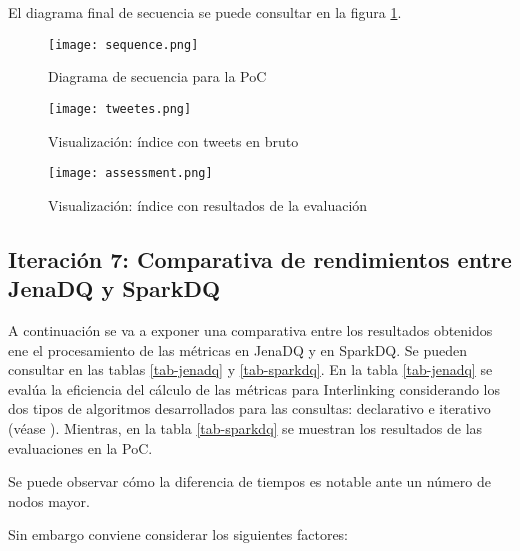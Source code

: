 El diagrama final de secuencia se puede consultar en la figura \ref{fig:sequence}.

\begin{figure}[!h]
  \begin{center}
    \texttt{[image: sequence.png]} 
    \caption{Diagrama de secuencia para la \acs{PoC}}
    \label{fig:sequence}
  \end{center}
\end{figure}


\begin{figure}[!h]
  \begin{center}
    \texttt{[image: tweetes.png]} 
    \caption{Visualización: índice con tweets en bruto}
    \label{fig:es-twitter}
  \end{center}
\end{figure}

\begin{figure}[!h]
  \begin{center}
    \texttt{[image: assessment.png]} 
    \caption{Visualización: índice con resultados de la evaluación}
    \label{fig:es-assessment}
  \end{center}
\end{figure}


\subsection{Iteración 7: Comparativa de rendimientos entre JenaDQ y SparkDQ}
\label{comparativa}

A continuación se va a exponer una comparativa entre los resultados obtenidos
ene el procesamiento de las métricas en JenaDQ y en SparkDQ. Se pueden consultar
en las tablas \ref{tab-jenadq} y \ref{tab-sparkdq}. En la tabla \ref{tab-jenadq}
se evalúa la eficiencia del cálculo de las métricas para Interlinking
considerando los dos tipos de algoritmos desarrollados para las consultas:
declarativo e iterativo (véase
\cite{PFC}). Mientras, en la tabla \ref{tab-sparkdq} se muestran los resultados
de las evaluaciones en la \acs{PoC}. 

Se puede observar cómo la diferencia de tiempos es notable ante un número de nodos mayor. 

\vspace{1cm}
Sin embargo conviene considerar los siguientes factores: 

